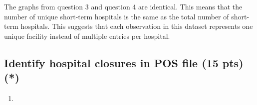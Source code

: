 \documentclass[
  letterpaper,
  DIV=11,
  numbers=noendperiod]{scrartcl}
\providecommand{\tightlist}{%
  \setlength{\itemsep}{0pt}\setlength{\parskip}{0pt}}\usepackage{longtable,booktabs,array}
\begin{document}
The graphs from question 3 and question 4 are identical. This means that
the number of unique short-term hospitals is the same as the total
number of short-term hospitals. This suggests that each observation in
this dataset represents one unique facility instead of multiple entries
per hospital.

\subsection{Identify hospital closures in POS file (15 pts)
(*)}\label{identify-hospital-closures-in-pos-file-15-pts}

\begin{enumerate}
\def\labelenumi{\arabic{enumi}.}
\tightlist
\item
\end{enumerate}
\end{document}
